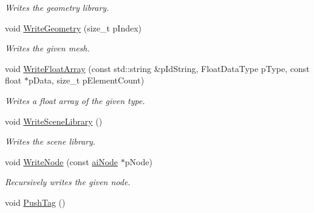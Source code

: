 \begin{DoxyCompactItemize}
\begin{DoxyCompactList}\small\item\em Writes the geometry library. \end{DoxyCompactList}\item 
\hypertarget{class_assimp_1_1_collada_exporter_aaf62280519e23905203df6ce754fc962}{void \hyperlink{class_assimp_1_1_collada_exporter_aaf62280519e23905203df6ce754fc962}{Write\+Geometry} (size\+\_\+t p\+Index)}\label{class_assimp_1_1_collada_exporter_aaf62280519e23905203df6ce754fc962}

\begin{DoxyCompactList}\small\item\em Writes the given mesh. \end{DoxyCompactList}\item 
\hypertarget{class_assimp_1_1_collada_exporter_ae92e4094707bfca3baa8e559d40f1b2d}{void \hyperlink{class_assimp_1_1_collada_exporter_ae92e4094707bfca3baa8e559d40f1b2d}{Write\+Float\+Array} (const std\+::string \&p\+Id\+String, Float\+Data\+Type p\+Type, const float $\ast$p\+Data, size\+\_\+t p\+Element\+Count)}\label{class_assimp_1_1_collada_exporter_ae92e4094707bfca3baa8e559d40f1b2d}

\begin{DoxyCompactList}\small\item\em Writes a float array of the given type. \end{DoxyCompactList}\item 
\hypertarget{class_assimp_1_1_collada_exporter_a0ccc1b5f7a32fec4529392775b476563}{void \hyperlink{class_assimp_1_1_collada_exporter_a0ccc1b5f7a32fec4529392775b476563}{Write\+Scene\+Library} ()}\label{class_assimp_1_1_collada_exporter_a0ccc1b5f7a32fec4529392775b476563}

\begin{DoxyCompactList}\small\item\em Writes the scene library. \end{DoxyCompactList}\item 
\hypertarget{class_assimp_1_1_collada_exporter_a8ec863b579b140333e7bac052b02d080}{void \hyperlink{class_assimp_1_1_collada_exporter_a8ec863b579b140333e7bac052b02d080}{Write\+Node} (const \hyperlink{structai_node}{ai\+Node} $\ast$p\+Node)}\label{class_assimp_1_1_collada_exporter_a8ec863b579b140333e7bac052b02d080}

\begin{DoxyCompactList}\small\item\em Recursively writes the given node. \end{DoxyCompactList}\item 
\hypertarget{class_assimp_1_1_collada_exporter_a3e4a87a84b2d7b7c1c201023e7566e11}{void \hyperlink{class_assimp_1_1_collada_exporter_a3e4a87a84b2d7b7c1c201023e7566e11}{Push\+Tag} ()}\label{class_assimp_1_1_collada_exporter_a3e4a87a84b2d7b7c1c201023e7566e11}


\end{DoxyCompactItemize}
